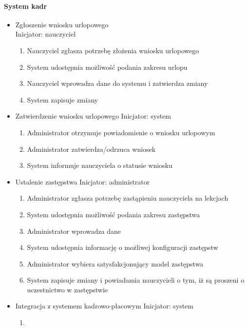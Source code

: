 \documentclass{article}
\begin{document}
\paragraph{System kadr}
\begin{itemize}


\item Zgłoszenie wniosku urlopowego\\
Inicjator: nauczyciel
\begin{enumerate}
    \item Nauczyciel zgłasza potrzebę złożenia wniosku urlopowego
    \item System udostępnia możliwość podania zakresu urlopu
    \item Nauczyciel wprowadza dane do systemu i zatwierdza zmiany
    \item System zapisuje zmiany
\end{enumerate}
    \item Zatwierdzenie wniosku urlopowego
Inicjator: system
\begin{enumerate}
    \item Administrator otrzymuje powiadomienie o wniosku urlopowym
    \item Administrator zatwierdza/odrzuca wniosek
    \item System informuje nauczyciela o statusie wniosku
\end{enumerate}
\item Ustalenie zastępstwa
Inicjator: administrator
\begin{enumerate}
    \item Administrator zgłasza potrzebę zastąpieniu nauczyciela na lekcjach
    \item System udostępnia możliwość podania zakresu zastępstwa
    \item Administrator wprowadza dane
    \item System udostępnia informację o możliwej konfiguracji zastępstw
    \item Administrator wybiera satysfakcjonujący model zastępstwa
    \item System zapisuje zmiany i powiadamia nauczycieli o tym, iż są proszeni o uczestnictwo w zastępstwie
\end{enumerate}
    \item Integracja z systemem kadrowo-płacowym
Inicjator: system
\begin{enumerate}
\item 
\end{enumerate}


\end{itemize}
\end{document}
